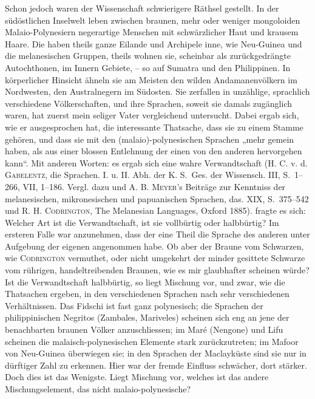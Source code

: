 {Schon jedoch waren der Wissenschaft schwierigere Räthsel gestellt. In der südöstlichen Inselwelt leben zwischen braunen, mehr oder weniger mongoloiden Malaio-Polynesiern negerartige Menschen mit schwärzlicher Haut und krausem \label{sp.280} Haare. Die haben theils ganze Eilande und Archipele inne, wie Neu-Guinea und die melanesischen Gruppen, theils wohnen sie, scheinbar als zurückgedrängte Autochthonen, im Innern  Gebiete, – so auf Sumatra und den Philippinen. In körperlicher Hinsicht ähneln sie am Meisten den wilden Andamanenvölkern im Nordwesten, den Australnegern im Südosten. Sie zerfallen in unzählige, sprachlich verschiedene Völkerschaften, und ihre Sprachen, soweit sie damals zugänglich waren, hat zuerst mein seliger Vater vergleichend untersucht. Dabei ergab sich, wie er ausgesprochen hat, die interessante Thatsache, dass sie zu einem Stamme gehören, und dass sie mit den (malaio)-polynesischen Sprachen „mehr gemein haben, als aus einer blossen Entlehnung der einen von den anderen hervorgehen kann“. Mit anderen Worten: es ergab sich eine wahre Verwandtschaft (H. C. v. d. \textsc{Gabelentz}, die  Sprachen. I. u. II. Abh. der K. S.~Ges. der Wissensch. III, S.~1–266, VII, 1–186. Vergl. dazu  und A. B. \textsc{Meyer}’s Beiträge zur Kenntniss der melanesischen, mikronesischen und papuanischen Sprachen, das. XIX, S.~375–542 und R. H. \textsc{Codrington}, The Melanesian Languages, Oxford 1885).  fragte es sich: Welcher Art ist die Verwandtschaft, ist sie vollbürtig oder halbbürtig? Im ersteren Falle war anzunehmen, dass der eine Theil die Sprache des anderen unter Aufgebung der eigenen angenommen habe. Ob aber der Braune vom Schwarzen, wie \textsc{Codrington} vermuthet, oder nicht umgekehrt der minder gesittete Schwarze vom rührigen, handeltreibenden Braunen, wie es mir glaubhafter scheinen würde? Ist  die Verwandtschaft halbbürtig, so liegt Mischung vor, und zwar, wie die Thatsachen ergeben, in den verschiedenen Sprachen nach sehr verschiedenen Verhältnissen. Das Fidschi ist fast ganz polynesisch; die Sprachen der philippinischen Negritos (Zambales, Mariveles) scheinen sich eng an jene der benachbarten braunen Völker anzuschliessen; im Maré (Nengone) und Lifu scheinen die malaisch-polynesischen Elemente stark zurückzutreten; im Mafoor von Neu-Guinea überwiegen sie; in den Sprachen der Maclayküste sind sie nur in dürftiger Zahl zu erkennen. Hier war der fremde Einfluss schwächer, \label{fp.274} dort stärker. Doch dies ist das Wenigste. Liegt Mischung vor, welches ist das andere Mischungselement, das nicht malaio-polynesische?

}
